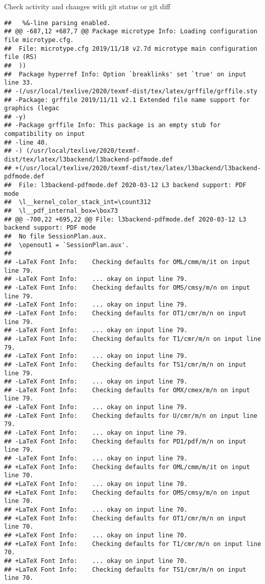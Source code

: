 \documentclass[ignorenonframetext,]{beamer}
\begin{document}
\begin{frame}[fragile]{Check activity and changes with git status or git
diff}
\begin{verbatim}
##   %&-line parsing enabled.
## @@ -687,12 +687,7 @@ Package microtype Info: Loading configuration file microtype.cfg.
##  File: microtype.cfg 2019/11/18 v2.7d microtype main configuration file (RS)
##  ))
##  Package hyperref Info: Option `breaklinks' set `true' on input line 33.
## -(/usr/local/texlive/2020/texmf-dist/tex/latex/grffile/grffile.sty
## -Package: grffile 2019/11/11 v2.1 Extended file name support for graphics (legac
## -y)
## -Package grffile Info: This package is an empty stub for compatibility on input 
## -line 40.
## -) (/usr/local/texlive/2020/texmf-dist/tex/latex/l3backend/l3backend-pdfmode.def
## +(/usr/local/texlive/2020/texmf-dist/tex/latex/l3backend/l3backend-pdfmode.def
##  File: l3backend-pdfmode.def 2020-03-12 L3 backend support: PDF mode
##  \l__kernel_color_stack_int=\count312
##  \l__pdf_internal_box=\box73
## @@ -700,22 +695,22 @@ File: l3backend-pdfmode.def 2020-03-12 L3 backend support: PDF mode
##  No file SessionPlan.aux.
##  \openout1 = `SessionPlan.aux'.
##  
## -LaTeX Font Info:    Checking defaults for OML/cmm/m/it on input line 79.
## -LaTeX Font Info:    ... okay on input line 79.
## -LaTeX Font Info:    Checking defaults for OMS/cmsy/m/n on input line 79.
## -LaTeX Font Info:    ... okay on input line 79.
## -LaTeX Font Info:    Checking defaults for OT1/cmr/m/n on input line 79.
## -LaTeX Font Info:    ... okay on input line 79.
## -LaTeX Font Info:    Checking defaults for T1/cmr/m/n on input line 79.
## -LaTeX Font Info:    ... okay on input line 79.
## -LaTeX Font Info:    Checking defaults for TS1/cmr/m/n on input line 79.
## -LaTeX Font Info:    ... okay on input line 79.
## -LaTeX Font Info:    Checking defaults for OMX/cmex/m/n on input line 79.
## -LaTeX Font Info:    ... okay on input line 79.
## -LaTeX Font Info:    Checking defaults for U/cmr/m/n on input line 79.
## -LaTeX Font Info:    ... okay on input line 79.
## -LaTeX Font Info:    Checking defaults for PD1/pdf/m/n on input line 79.
## -LaTeX Font Info:    ... okay on input line 79.
## +LaTeX Font Info:    Checking defaults for OML/cmm/m/it on input line 70.
## +LaTeX Font Info:    ... okay on input line 70.
## +LaTeX Font Info:    Checking defaults for OMS/cmsy/m/n on input line 70.
## +LaTeX Font Info:    ... okay on input line 70.
## +LaTeX Font Info:    Checking defaults for OT1/cmr/m/n on input line 70.
## +LaTeX Font Info:    ... okay on input line 70.
## +LaTeX Font Info:    Checking defaults for T1/cmr/m/n on input line 70.
## +LaTeX Font Info:    ... okay on input line 70.
## +LaTeX Font Info:    Checking defaults for TS1/cmr/m/n on input line 70.

\end{verbatim}
\end{frame}
\end{document}
